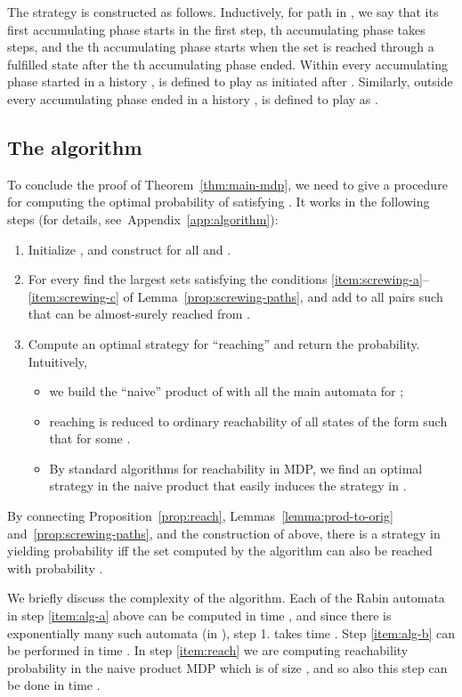 \documentclass[a4paper,UKenglish]{lipics}
\newcommand{\citeapp}[1]{Appendix~\ref{#1}}
\begin{document}
The strategy  is constructed as follows.
Inductively, for path  in , we say that its first accumulating phase starts in the first step, th accumulating phase takes  steps, and the th accumulating phase starts when the set  is reached through a fulfilled state after the th accumulating phase ended.
Within every accumulating phase started in a history ,  is defined to play as  initiated after . Similarly, outside every accumulating phase ended in a history ,  is defined to play as .

\subsection{The algorithm}
\label{sec:alg}
To conclude the proof of Theorem~\ref{thm:main-mdp}, we need to give a procedure for  
computing the optimal probability of satisfying .
It works in the following steps (for details, see~\citeapp{app:algorithm}):
\begin{enumerate}
	\item\label{item:alg-a} Initialize , and construct  for all  and .
\item\label{item:alg-b} For every  
find the largest sets  satisfying the conditions \ref{item:screwing-a}--\ref{item:screwing-c} of Lemma~\ref{prop:screwing-paths}, and add to  all pairs  such that  can be almost-surely reached from 
	.
\item\label{item:reach} Compute an optimal strategy  for ``reaching''   and return the probability. Intuitively,
	\begin{itemize}
		\item we build the ``naive'' product of  with all the main automata  for ;
\item 
		reaching  is reduced to ordinary reachability of all states of the form  such that  for some .
\item
		By standard algorithms for reachability in MDP, we find an optimal strategy  in the naive product that easily induces the strategy  in .
	\end{itemize}
\end{enumerate}

\noindent
By connecting Proposition~\ref{prop:reach}, Lemmas~\ref{lemma:prod-to-orig} and~\ref{prop:screwing-paths}, and the construction of  above, there is a strategy  in  yielding probability  iff the set  computed by the algorithm can also be reached with probability .

We briefly discuss the complexity of the algorithm. Each of the Rabin automata in step \ref{item:alg-a} above can be computed in time ,
and since there is exponentially many such automata (in ), step 1. takes time .
Step \ref{item:alg-b} can be performed in time .
In step \ref{item:reach} we are computing reachability probability in the naive product MDP which is of size ,
and so also this step can be done in time .
\end{document}

